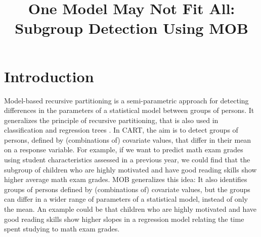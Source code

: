 \documentclass[doc,floatsintext,natbib]{apa7}
\title{One Model May Not Fit All: Subgroup Detection Using MOB}
\begin{document}

\renewenvironment{Schunk}{\small}{}


\maketitle



\newpage
\section{Introduction}
\label{sec:Introduction}

Model-based recursive partitioning \citep[MOB;][]{ZeilyHoth08} is a semi-parametric approach for detecting differences in the parameters of a statistical model between groups of persons. It generalizes the principle of recursive partitioning, that is also used in classification and regression trees \citep[CART; ][]{Breetal:1984}. 
In CART, the aim is to detect groups of persons, defined by (combinations of) covariate values, that differ in their mean on a response variable. For example, if we want to predict math exam grades using student characteristics assessed in a previous year, we could find that the subgroup of children who are highly motivated and have good reading skills show higher average math exam grades. 
MOB generalizes this idea: It also identifies groups of persons defined by (combinations of) covariate values, but the groups can differ in a wider range of parameters of a statistical model, instead of only the mean. An example could be that children who are highly motivated and have good reading skills show higher slopes in a regression model relating the time spent studying to math exam grades. 
\end{document}
